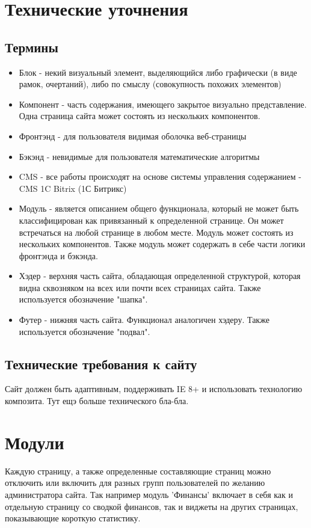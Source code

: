 \documentclass[DIV=calc, paper=a4, fontsize=11pt]{scrartcl} %
\begin{document}
\section{Технические уточнения}

\subsection{Термины}

        \begin{itemize}
        \item Блок - некий визуальный элемент, выделяющийся либо графически (в виде рамок, очертаний), либо по смыслу (совокупность похожих элементов)
        \item Компонент - часть содержания, имеющего закрытое визуально представление. Одна страница сайта может состоять из нескольких компонентов.
        \item Фронтэнд - для пользователя видимая оболочка веб-страницы
        \item Бэкэнд - невидимые для пользователя математические алгоритмы
        \item CMS - все работы происходят на основе системы управления содержанием - CMS 1C Bitrix (1С Битрикс)
        \item Модуль - является описанием общего функционала, который не может быть классифицирован как привязанный к определенной странице. Он может встречаться на любой странице в любом месте. Модуль может состоять из нескольких компонентов. Также модуль может содержать в себе части логики фронтэнда и бэкэнда.
        \item Хэдер - верхняя часть сайта, обладающая определенной структурой, которая видна сквозняком на всех или почти всех страницах сайта. Также используется обозначение "шапка".
        \item Футер - нижняя часть сайта. Функционал аналогичен хэдеру. Также используется обозначение "подвал".
    \end{itemize}


\subsection{Технические требования к сайту}
Сайт должен быть адаптивным, поддерживать IE 8+ и использовать технологию композита.
Тут ещэ больше технического бла-бла.


\section{Модули}
Каждую страницу, а также определенные составляющие страниц можно отключить или включить для разных групп пользователей по желанию администратора сайта. Так например модуль 'Финансы' включает в себя как и отдельную страницу со сводкой финансов, так и виджеты на других страницах, показывающие короткую статистику.
\end{document}
